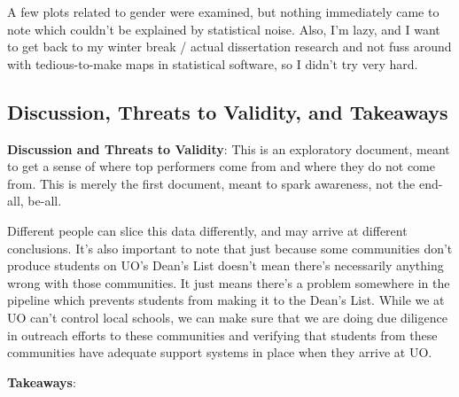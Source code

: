 \documentclass[10pt]{article}
\begin{document}
A few plots related to gender were examined, but nothing immediately came to note which couldn't be explained by statistical noise. Also, I'm lazy, and I want to get back to my winter break / actual dissertation research and not fuss around with tedious-to-make maps in statistical software, so I didn't try very hard.

\subsection{Discussion, Threats to Validity, and Takeaways}


\textbf{Discussion and Threats to Validity}: This is an exploratory document, meant to get a sense of where top performers come from and where they do not come from. This is merely the first document, meant to spark awareness, not the end-all, be-all.

Different people can slice this data differently, and may arrive at different conclusions. It's also important to note that just because some communities don't produce students on UO's Dean's List doesn't mean there's necessarily anything wrong with those communities. It just means there's a problem somewhere in the pipeline which prevents students from making it to the Dean's List. While we at UO can't control local schools, we can make sure that we are doing due diligence in outreach efforts to these communities and verifying that students from these communities have adequate support systems in place when they arrive at UO.

\qquad

\textbf{Takeaways}:
\end{document}
